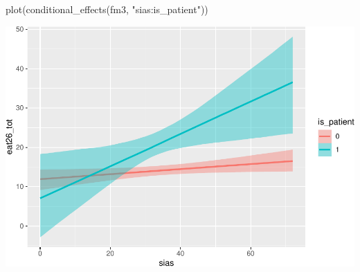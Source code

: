 \documentclass[
]{article}
\newenvironment{Shaded}{\begin{snugshade}}{\end{snugshade}}
\newcommand{\FunctionTok}[1]{\textcolor[rgb]{0.00,0.00,0.00}{#1}}
\newcommand{\NormalTok}[1]{#1}
\newcommand{\StringTok}[1]{\textcolor[rgb]{0.31,0.60,0.02}{#1}}
\begin{document}
\begin{Shaded}
\begin{Highlighting}[]
\FunctionTok{plot}\NormalTok{(}\FunctionTok{conditional\_effects}\NormalTok{(fm3, }\StringTok{"sias:is\_patient"}\NormalTok{))}
\end{Highlighting}
\end{Shaded}

\includegraphics{050_quest_groups_files/figure-latex/unnamed-chunk-2-18.pdf}
\end{document}
